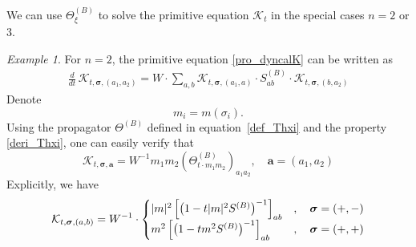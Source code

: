 \documentclass[10pt,reqno]{article}
\theoremstyle{plain} %
\theoremstyle{remark}
\newtheorem{example}[theorem]{Example}
\numberwithin{equation}{section}
\begin{document}
We can  use $\Theta^{(B)}_\xi$ to solve  the primitive equation  $\mathcal{K}_t$ in the special cases $n = 2$ or $ 3$.

\begin{example} %
For  $n = 2$, the  primitive  equation  \eqref{pro_dyncalK} can be written as 
\begin{align}
    \frac{d}{dt}\, \mathcal{K}_{t, \boldsymbol{\sigma}, (a_1, a_2)} = W \cdot \sum_{a, b} \mathcal{K}_{t, \boldsymbol{\sigma}, (a_1, a)} \cdot S^{(B)}_{ab} \cdot \mathcal{K}_{t, \boldsymbol{\sigma}, (b, a_2)}
\end{align}
Denote 
\begin{equation}\label{eq_defm_i}
    m_i = m(\sigma_i).
\end{equation}
Using the propagator  $\Theta^{(B)}$ defined in equation~\eqref{def_Thxi} and the property \eqref{deri_Thxi}, one can easily verify that
\begin{equation}\label{Kn2sol}
    \mathcal{K}_{t, \boldsymbol{\sigma}, \textbf{a}} = W^{-1} m_1 m_2 \left(\Theta^{(B)}_{t \cdot m_1 m_2}\right)_{a_1 a_2}, \quad \textbf{a} = (a_1, a_2)
\end{equation}
Explicitly, we have 
\begin{equation}\label{Kn2sol2}
{\cal K}_{t,\boldsymbol{\sigma},(a,b)}
=   W^{-1} \cdot \begin{cases}
     |m |^2\left[\left(1- {  t }|m |^2 S^{(B)}\right)^{-1}\right]_{ab} &, \quad \boldsymbol{\sigma}=(+,-)\\
  m^2\left[\left(1- {  t } m^2 S^{(B)}\right)^{-1}\right]_{ab}  &, \quad \boldsymbol{\sigma}=(+,+)    
\end{cases}
\end{equation}


\end{example}
\end{document}
